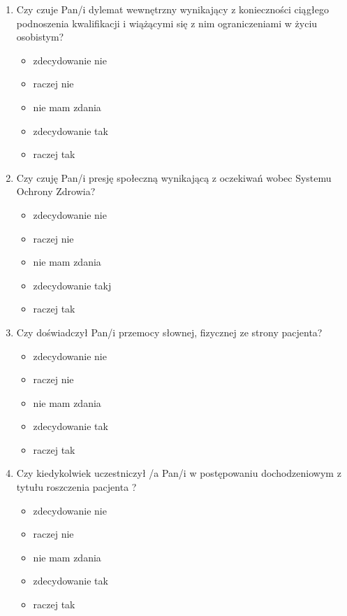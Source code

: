 \documentclass[a4paper,12pt,twoside,openright]{mwrep}
\begin{document}
\begin{enumerate}[label=\arabic*)]
			\item{Czy czuje Pan/i dylemat wewnętrzny wynikający z konieczności ciągłego podnoszenia kwalifikacji i wiążącymi się z nim ograniczeniami w życiu osobistym?}
		\begin{itemize}
			\item{zdecydowanie nie}
			\item{raczej nie}
			\item{nie mam zdania}
			\item{zdecydowanie tak}
			\item{raczej tak}
		\end{itemize}
		\vspace{\baselineskip}
			\item{Czy czuję Pan/i presję społeczną wynikającą z oczekiwań wobec Systemu Ochrony Zdrowia?}
		\begin{itemize}
			\item{zdecydowanie nie}
			\item{raczej nie}
			\item{nie mam zdania}
			\item{zdecydowanie takj}
			\item{raczej tak}
		\end{itemize}
		\vspace{\baselineskip}
		
			\item{Czy doświadczył Pan/i przemocy słownej, fizycznej ze strony pacjenta?}
		\begin{itemize}
			\item{zdecydowanie nie}
			\item{raczej nie}
			\item{nie mam zdania}
			\item{zdecydowanie tak}
			\item{raczej tak}
		\end{itemize}
		\vspace{\baselineskip}
		
			\item{Czy kiedykolwiek uczestniczył /a Pan/i w postępowaniu dochodzeniowym z tytułu roszczenia pacjenta ?}
		\begin{itemize}
			\item{zdecydowanie nie}
			\item{raczej nie}
			\item{nie mam zdania}
			\item{zdecydowanie tak}
			\item{raczej tak}
		\end{itemize}
		\vspace{\baselineskip}
		

\end{enumerate}
\end{document}
